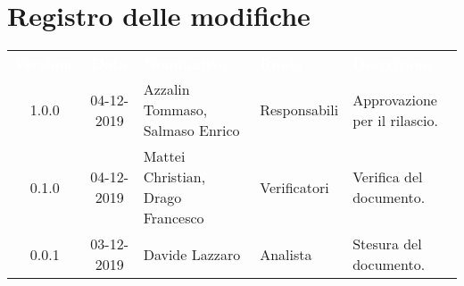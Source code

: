 \section*{Registro delle modifiche}
{
\renewcommand{\arraystretch}{1.5}
\centering
\begin{longtable}{ c c  C{4cm}  C{3cm} C{4cm}}
\textcolor{white}{\textbf{Versione}} & \textcolor{white}{\textbf{Data}} & \textcolor{white}{\textbf{Nominativo}} & \textcolor{white}{\textbf{Ruolo}} & \textcolor{white}{\textbf{Descrizione}}\\	


1.0.0 & 04-12-2019 & Azzalin Tommaso, Salmaso Enrico & Responsabili & Approvazione per il rilascio.  \\
		
0.1.0 & 04-12-2019 & Mattei Christian, Drago Francesco & Verificatori & Verifica del documento.  \\
		
0.0.1 & 03-12-2019 & Davide Lazzaro & Analista & Stesura del documento.  \\
		
		
\end{longtable}
}